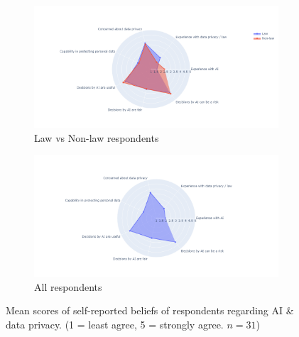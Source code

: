 \begin{figure}[!ht]
    \begin{subfigure}[b]{1\textwidth}
      \centering
      \includegraphics[width=1\linewidth]{figures/demo_3.png}
      \caption{Law vs Non-law respondents}
    \end{subfigure}
    \hfill
    \begin{subfigure}[b]{1\textwidth}
      \centering
      \includegraphics[width=1\linewidth]{figures/demo_4.png}
      \caption{All respondents}
    \end{subfigure}
    \caption{Mean scores of self-reported beliefs of respondents regarding AI \& data privacy. (1 = least agree, 5 = strongly agree. $n=31$)}
    \label{fig:demo_3}
\end{figure}

